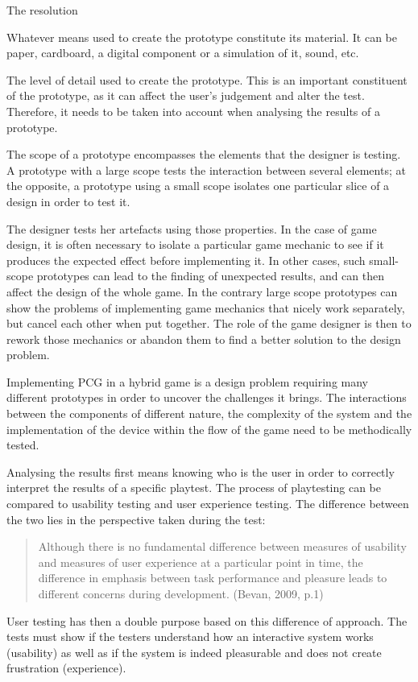 \begin{labeling}{The resolution}
\item [\textbf{The material}] Whatever means used to create the prototype constitute its material. It can be paper, cardboard, a digital component or a simulation of it, sound, etc.
\item [\textbf{The resolution}] The level of detail used to create the prototype. This is an important constituent of the prototype, as it can affect the user's judgement and alter the test. Therefore, it needs to be taken into account when analysing the results of a prototype.
\item [\textbf{The scope}] The scope of a prototype encompasses the elements that the designer is testing. A prototype with a large scope tests the interaction between several elements; at the opposite, a prototype using a small scope isolates one particular slice of a design in order to test it.
\end{labeling}

The designer tests her artefacts using those properties. In the case of game design, it is often necessary to isolate a particular game mechanic to see if it produces the expected effect before implementing it. In other cases, such small-scope prototypes can lead to the finding of unexpected results, and can then affect the design of the whole game. In the contrary large scope prototypes can show the problems of implementing game mechanics that nicely work separately, but cancel each other when put together. The role of the game designer is then to rework those mechanics or abandon them to find a better solution to the design problem. 

Implementing PCG in a hybrid game is a design problem requiring many different prototypes in order to uncover the challenges it brings. The interactions between the components of different nature, the complexity of the system and the implementation of the device within the flow of the game need to be methodically tested.

Analysing the results first means knowing who is the user in order to correctly interpret the results of a specific playtest. The process of playtesting can be compared to usability testing and user experience testing. The difference between the two lies in the perspective taken during the test:
\begin{quotation}
Although there is no fundamental difference between measures of usability and measures of user experience at a particular point in time, the difference in emphasis between task performance and pleasure leads to different concerns during development. (Bevan, 2009, p.1) \cite{pdf:use}
\end{quotation}
User testing has then a double purpose based on this difference of approach. The tests must show if the testers understand how an interactive system works (usability) as well as if the system is indeed pleasurable and does not create frustration (experience).


